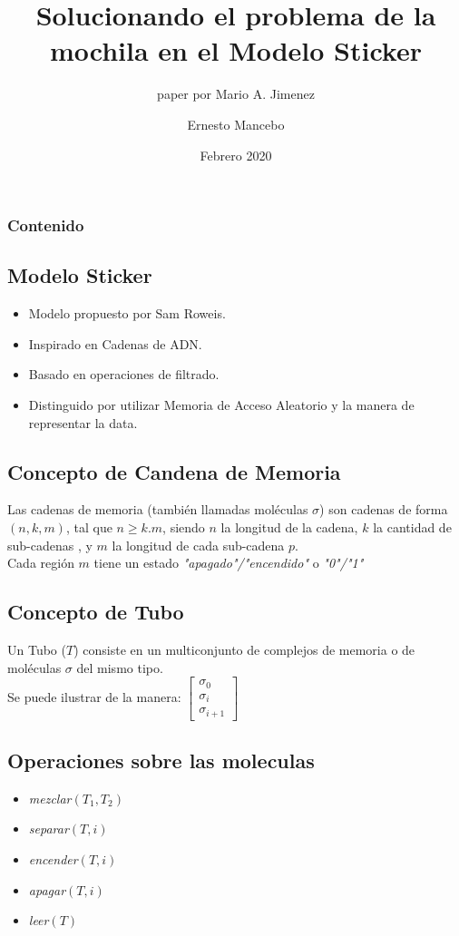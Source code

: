 \documentclass[12pt]{beamer}
\title{Solucionando el problema de la mochila en el Modelo Sticker}
\subtitle{paper por Mario A. Jimenez}
\author{Ernesto Mancebo}
\institute{Universidad de Sevilla}
\date{Febrero 2020}
\begin{document}
 \begin{frame}
    \titlepage
 \end{frame}
 \begin{frame}
     \frametitle{Contenido}
     \tableofcontents
 \end{frame}
 \begin{frame}
     \section{Modelo Sticker}
     \begin{itemize}
         \item Modelo propuesto por Sam Roweis.
         \item Inspirado en Cadenas de ADN.
         \item Basado en operaciones de filtrado.
         \item Distinguido por utilizar Memoria de Acceso Aleatorio y la manera de representar la data.
     \end{itemize}
 \end{frame}
 \begin{frame}
     \subsection{Concepto de Candena de Memoria}
     Las cadenas de memoria (también llamadas moléculas $\sigma$) son cadenas de forma $(n, k, m)$, tal que $n\geq k.m$, siendo $n$ la longitud de la cadena, $k$ la cantidad de sub-cadenas , y $m$ la longitud de cada sub-cadena $p$. \\ 
     Cada región $m$ tiene un estado \emph{"apagado"/"encendido"} o \emph{"0"/"1"}
 \end{frame}
 \begin{frame}
     \subsection{Concepto de Tubo}
     Un Tubo ($T$) consiste en un multiconjunto de complejos de memoria o de moléculas $\sigma$ del mismo tipo. \\ Se puede ilustrar de la manera:
    $
    \begin{bmatrix}
        \sigma_0 \\
        \sigma_i \\
        \sigma_{i + 1} 
    \end{bmatrix}
    $
 \end{frame}
 \begin{frame}
     \subsection{Operaciones sobre las moleculas}
     \begin{itemize}
        \item \emph{mezclar}$(T_1,T_2)$
        \item \emph{separar}$(T, i)$
        \item \emph{encender}$(T, i)$
        \item \emph{apagar}$(T, i)$
        \item \emph{leer}$(T)$
     \end{itemize}
 \end{frame}
\end{document}
